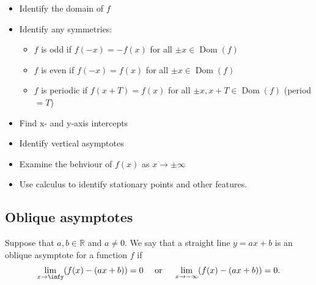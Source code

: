 \documentclass{report}
\begin{document}
			\begin{itemize}
				\item Identify the domain of $f$
				\item Identify any symmetries:
					\begin{itemize}
						\item $f$ is \textcolor{pastel_blue}{odd} if $f(-x) = -f(x)$ for all $\pm x \in \operatorname{Dom}(f)$
						\item $f$ is \textcolor{pastel_blue}{even} if $f(-x) = f(x)$ for all $\pm x \in \operatorname{Dom}(f)$
						\item $f$ is \textcolor{pastel_blue}{periodic} if $f(x + T) = f(x)$ for all $\pm x, x + T \in \operatorname{Dom}(f)$ \quad (period $ = T$)
					\end{itemize}
				\item Find x- and y-axis intercepts
				\item Identify vertical asymptotes
				\item Examine the behviour of $f(x)$ as $x \to \pm \infty$
				\item Use calculus to identify stationary points and other features.
			\end{itemize}

		\subsection{Oblique asymptotes}
			
			Suppose that $a,b \in \mathbb{R}$ and $a \neq 0$. We say that a straight line $y = ax+b$ is an oblique asymptote for a function $f$ if
				\begin{align*}
					\lim_{x\to \infy} (f(x) - (ax+b)) = 0 \quad \text{ or } \quad \lim_{x\to -\infty} (f(x) - (ax+b)) = 0.
				\end{align*}
\end{document}
